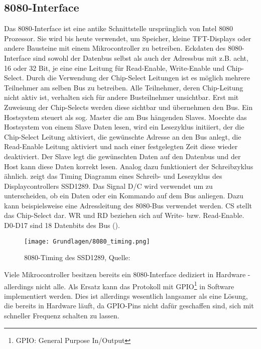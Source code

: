\subsection{8080-Interface}
Das 8080-Interface ist eine antike Schnittstelle ursprünglich von Intel 8080 Prozessor. Sie wird bis heute verwendet, um Speicher, kleine TFT-Displays oder andere Bausteine mit einem Mikrocontroller zu betreiben. Eckdaten des 8080-Interface sind sowohl der Datenbus selbst als auch der Adressbus mit z.B. acht, 16 oder 32 Bit, je eine eine Leitung für Read-Enable, Write-Enable und Chip-Select. Durch die Verwendung der Chip-Select Leitungen ist es möglich mehrere Teilnehmer am selben Bus zu betreiben. Alle Teilnehmer, deren Chip-Leitung nicht aktiv ist, verhalten sich für andere Busteilnehmer unsichtbar. Erst mit Zuweisung der Chip-Selects werden diese sichtbar und übernehmen den Bus. Ein Hostsystem steuert als sog. Master die am Bus hängenden Slaves. Moechte das Hostsystem von einem Slave Daten lesen, wird ein Lesezyklus initiiert, der die Chip-Select Leitung aktiviert, die gewünschte Adresse an den Bus anlegt, die Read-Enable Leitung aktiviert und nach einer festgelegten Zeit diese wieder deaktiviert. Der Slave legt die gewünschten Daten auf den Datenbus und der Host kann diese Daten korrekt lesen. Analog dazu funktioniert der Schreibzyklus ähnlich. 
 zeigt das Timing Diagramm eines Schreib- und Lesezyklus des Displaycontrollers SSD1289. Das Signal D/C wird verwendet um zu unterscheiden, ob ein Daten oder ein Kommando auf dem Bus anliegen. Dazu kann beispielsweise eine Adressleitung des 8080-Bus verwendet werden. CS stellt das Chip-Select dar. WR und RD beziehen sich auf Write- bzw. Read-Enable. D0-D17 sind 18 Datenbits des Bus (\cite{SSD2007}). 

\begin{figure}[htp]
	\centering
	\texttt{[image: Grundlagen/8080\_timing.png]}
	\caption{8080-Timing des SSD1289, Quelle: \cite{SSD2007}}
	\label{fig:8080_timing}
\end{figure}


Viele Mikrocontroller besitzen bereits ein 8080-Interface dediziert in Hardware - allerdings nicht alle. Als Ersatz kann das Protokoll mit GPIO\footnote{GPIO: General Purpose In/Output} in Software implementiert werden. Dies ist allerdings wesentlich langsamer als eine Lösung, die bereits in Hardware läuft, da GPIO-Pins nicht dafür geschaffen sind, sich mit schneller Frequenz schalten zu lassen.
\clearpage

